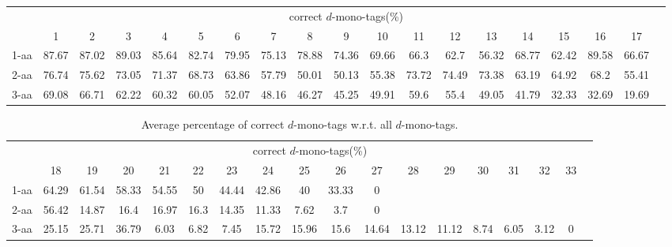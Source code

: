 \documentclass{article}
\begin{document}
\begin{table}[h]\tiny
\vspace{3mm}
{\centering
\begin{center}
\begin{tabular}{|l|c|c|c|c|c|c|c|c|c|c|c|c|c|c|c|c|c|c|}
  \hline
  & \multicolumn{ 17 }{|c|}{correct $d$-mono-tags(\%)} \\
  \cline{2- 18}
    & 1 & 2 & 3 & 4 & 5 & 6 & 7 & 8 & 9 & 10 & 11 & 12 & 13 & 14 & 15 & 16 & 17\\
  \hline
1-aa  & 87.67 & 87.02 & 89.03 & 85.64 & 82.74 & 79.95 & 75.13 & 78.88 & 74.36 & 69.66 & 66.3 & 62.7 & 56.32 & 68.77 & 62.42 & 89.58 & 66.67\\
2-aa  & 76.74 & 75.62 & 73.05 & 71.37 & 68.73 & 63.86 & 57.79 & 50.01 & 50.13 & 55.38 & 73.72 & 74.49 & 73.38 & 63.19 & 64.92 & 68.2 & 55.41\\
3-aa  & 69.08 & 66.71 & 62.22 & 60.32 & 60.05 & 52.07 & 48.16 & 46.27 & 45.25 & 49.91 & 59.6 & 55.4 & 49.05 & 41.79 & 32.33 & 32.69 & 19.69\\
 \hline
\end{tabular}
\end{center}
\par}
\centering

\vspace{3mm}
\label{table:correct-d-mono-tags}
\end{table}
\begin{table}[h]\tiny
\vspace{3mm}
{\centering
\begin{center}
\begin{tabular}{|l|c|c|c|c|c|c|c|c|c|c|c|c|c|c|c|c|c|}
  \hline
  & \multicolumn{ 16 }{|c|}{correct $d$-mono-tags(\%)} \\
  \cline{2- 17}
    & 18 & 19 & 20 & 21 & 22 & 23 & 24 & 25 & 26 & 27 & 28 & 29 & 30 & 31 & 32 & 33\\
  \hline
1-aa  & 64.29 & 61.54 & 58.33 & 54.55 & 50 & 44.44 & 42.86 & 40 & 33.33 & 0 &  &  &  &  &  & \\
2-aa  & 56.42 & 14.87 & 16.4 & 16.97 & 16.3 & 14.35 & 11.33 & 7.62 & 3.7 & 0 &  &  &  &  &  & \\
3-aa  & 25.15 & 25.71 & 36.79 & 6.03 & 6.82 & 7.45 & 15.72 & 15.96 & 15.6 & 14.64 & 13.12 & 11.12 & 8.74 & 6.05 & 3.12 & 0\\
 \hline
\end{tabular}
\end{center}
\par}
\centering

\caption{ Average percentage of correct $d$-mono-tags w.r.t. all $d$-mono-tags.}

\vspace{3mm}
\label{table:correct-d-mono-tags}
\end{table}
\end{document}
